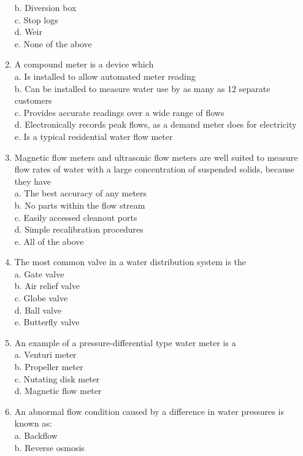 \begin{enumerate}[1.]
b. Diversion box\\
c. Stop logs\\
d. Weir\\
e. None of the above\\
\item A compound meter is a device which\\
a. Is installed to allow automated meter reading\\
b. Can be installed to measure water use by as many as 12 separate customers\\
c. Provides accurate readings over a wide range of flows\\
d. Electronically records peak flows, as a demand meter does for electricity\\
e. Is a typical residential water flow meter\\
\item Magnetic flow meters and ultrasonic flow meters are well suited to measure flow rates of water with a large concentration of suspended solids, because they have\\
a. The best accuracy of any meters\\
b. No parts within the flow stream\\
c. Easily accessed cleanout ports\\
d. Simple recalibration procedures\\
e. All of the above\\
\item The most common valve in a water distribution system is the\\
a. Gate valve\\
b. Air relief valve\\
c. Globe valve\\
d. Ball valve\\
e. Butterfly valve\\
\item An example of a pressure-differential type water meter is a\\
a. Venturi meter\\
b. Propeller meter\\
c. Nutating disk meter\\
d. Magnetic flow meter\\
\item An abnormal flow condition caused by a difference in water pressures is known as:\\
a. Backflow\\
b. Reverse osmosis\\

\end{enumerate}
